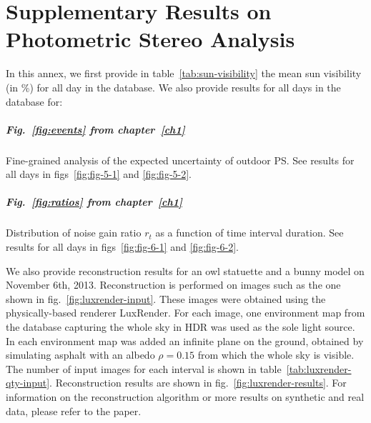 \chapter{Supplementary Results on Photometric Stereo Analysis}     %
\label{annex1}

\graphicspath{{annex3_figures/}}


In this annex, we first provide in table~\ref{tab:sun-visibility} the mean sun visibility (in \%) for all day in the database. We also provide results for all days in the database for: 
\vspace{-.5em}
\paragraph{Fig.~\ref{fig:events} from chapter~\ref{ch1}} Fine-grained analysis of the expected uncertainty of outdoor PS. See results for all days in figs~\ref{fig:fig-5-1} and \ref{fig:fig-5-2}.


\paragraph{Fig.~\ref{fig:ratios} from chapter~\ref{ch1}} Distribution of noise gain ratio $r_t$ as a function of time interval duration. See results for all days in figs~\ref{fig:fig-6-1} and \ref{fig:fig-6-2}.

\vspace{1em}

We also provide reconstruction results for an owl statuette and a bunny model on November 6th, 2013. Reconstruction is performed on images such as the one shown in fig.~\ref{fig:luxrender-input}. These images were obtained using the physically-based renderer LuxRender. For each image, one environment map from the database capturing the whole sky in HDR was used as the sole light source. In each environment map was added an infinite plane on the ground, obtained by simulating asphalt with an albedo $\rho = 0.15$ from which the whole sky is visible. The number of input images for each interval is shown in table~\ref{tab:luxrender-qty-input}. Reconstruction results are shown in fig.~\ref{fig:luxrender-results}. For information on the reconstruction algorithm or more results on synthetic and real data, please refer to the paper.


